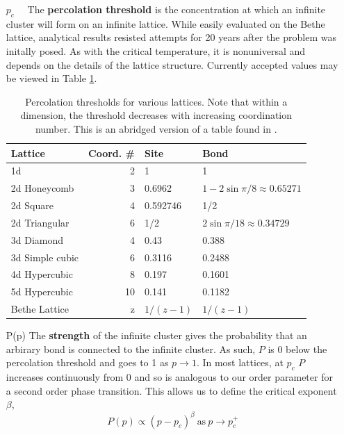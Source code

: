 \begin{enumerate}

\item[$p_c\quad$] The \textbf{percolation threshold} is the concentration at which an infinite cluster
will form on an infinite lattice.  While easily evaluated on the Bethe lattice, analytical
results resisted attempts for 20 years after the problem was initally posed.  As with
the critical temperature, it is nonuniversal and depends on the details of the lattice
structure.  Currently accepted values may be viewed in Table \ref{tab:perc_thresh}.

\begin{table}
  \centering
  \begin{tabular}{ | l | r | l | l | }
    \hline
    Lattice & Coord. \# & Site & Bond \\
    \hline \hline
    1d & 2 & 1 & 1 \\ \hline
    2d Honeycomb & 3 & 0.6962 & $1-2\sin{\pi/8}\approx 0.65271$ \\ \hline
    2d Square & 4 & 0.592746 & 1/2 \\ \hline
    2d Triangular & 6 & 1/2 & $2\sin{\pi/18}\approx 0.34729$ \\ \hline
    3d Diamond & 4 & 0.43 & 0.388 \\ \hline
    3d Simple cubic & 6 & 0.3116 & 0.2488 \\ \hline
    4d Hypercubic & 8 & 0.197 & 0.1601 \\ \hline
    5d Hypercubic & 10 & 0.141 & 0.1182 \\ \hline
    Bethe Lattice & z & $1 / (z-1)$ & $1 / (z-1)$ \\ \hline
  \end{tabular}
  \caption{Percolation thresholds for various lattices.  Note that within a dimension,
           the threshold decreases with increasing coordination number.  This is an
           abridged version of a table found in \cite{Christensen2002}.}
  \label{tab:perc_thresh}
\end{table}

\item[P(p)] The \textbf{strength} of the infinite cluster gives the probability that
an arbirary bond is connected to the infinite cluster.  As such, $P$ is 0 below
the percolation threshold and goes to 1 as $p\to 1$.  In most lattices, at $p_c$
$P$ increases continuously from 0 and so is analogous to our order parameter for a second
order phase transition.  This allows us to define the critical exponent $\beta$,
\[ P(p) \propto (p - p_c)^{\beta} \ \text{as}\ p\to p_c^+ \]


\end{enumerate}
